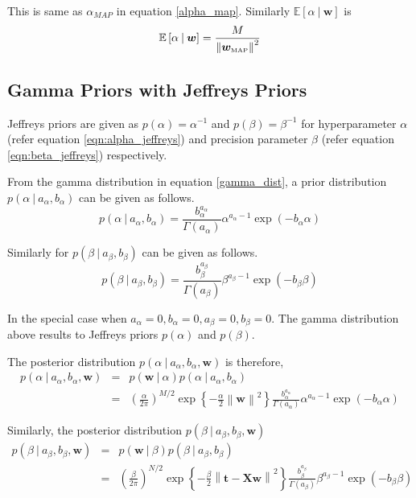 \documentclass[11pt]{article}
\newcommand{\mean}[1]{\mathbb{E}\left[#1\right]}
\newcommand{\map}[1]{{#1}_{\text{\tiny MAP}}}
\newcommand\given[1][]{\:#1\vert\:}
\newcommand{\norm}[1]{\left\lVert#1\right\rVert}
\begin{document}
This is same as $\alpha_{MAP}$ in equation \ref{alpha_map}. Similarly $\mean{\alpha \given \bm{w}}$ is
\begin{equation}
    \mean{\alpha \given \bm{w}} = \frac{M}{\norm{\map{\bm{w}}}^2}
\end{equation}

\subsection{Gamma Priors with Jeffreys Priors}

Jeffreys priors are given as $p(\alpha) = \alpha^{-1}$ and $p(\beta) = \beta^{-1}$ for hyperparameter $\alpha$ (refer equation \ref{eqn:alpha_jeffreys}) and precision parameter $\beta$ (refer equation \ref{eqn:beta_jeffreys}) respectively. 

From the gamma distribution in equation \ref{gamma_dist}, a prior distribution $p(\alpha \given a_{\alpha}, b_{\alpha})$ can be given as follows.
\begin{equation} \label{gamma_alpha}
    p(\alpha \given a_{\alpha}, b_{\alpha}) =  \frac{b_{\alpha}^{a_{\alpha}}}{\Gamma(a_{\alpha})}\alpha^{a_{\alpha}-1}\exp{(-b_{\alpha}\alpha)}
\end{equation}

Similarly for $p(\beta \given a_{\beta}, b_{\beta})$ can be given as follows.
\begin{equation}\label{gamma_beta}
    p(\beta \given a_{\beta}, b_{\beta}) =  \frac{b_{\beta}^{a_{\beta}}}{\Gamma(a_{\beta})}\beta^{a_{\beta}-1}\exp{(-b_{\beta}\beta)}
\end{equation}

In the special case when $a_{\alpha}=0, b_{\alpha}=0, a_{\beta} = 0, b_{\beta}=0$. The gamma distribution above results to Jeffreys priors $p(\alpha)$ and $p(\beta)$. 

The posterior distribution $p(\alpha \given a_{\alpha}, b_{\alpha}, \bm{w})$ is therefore,
\begin{eqnarray} \label{eqn:posterior_gamma_alpha}
    p(\alpha \given a_{\alpha}, b_{\alpha}, \bm{w}) 
    &=& p(\bm{w} \given \alpha)p(\alpha \given a_{\alpha}, b_{\alpha})\\
    &=& \left( \frac{\alpha}{2\pi}\right)^{M/2} \exp{\left\{ -\frac{\alpha}{2}\norm{\bm{w}}^2\right\}}\frac{b_{\alpha}^{a_{\alpha}}}{\Gamma(a_{\alpha})}\alpha^{a_{\alpha}-1}\exp{(-b_{\alpha}\alpha)}
\end{eqnarray}

Similarly, the posterior distribution $p(\beta \given a_{\beta}, b_{\beta}, \bm{w})$
\begin{eqnarray}\label{eqn:posterior_gamma_beta}
    p(\beta \given a_{\beta}, b_{\beta}, \bm{w}) 
    &=& p(\bm{w} \given \beta)p(\beta \given a_{\beta}, b_{\beta})\\
    &=& \left( \frac{\beta}{2\pi}\right)^{N/2}\exp\left\{-\frac{\beta}{2}\norm{\bm{t}-\bm{X}\bm{w}}^2 \right\}\frac{b_{\beta}^{a_{\beta}}}{\Gamma(a_{\beta})}\beta^{a_{\beta}-1}\exp{(-b_{\beta}\beta)}
\end{eqnarray}
\end{document}
